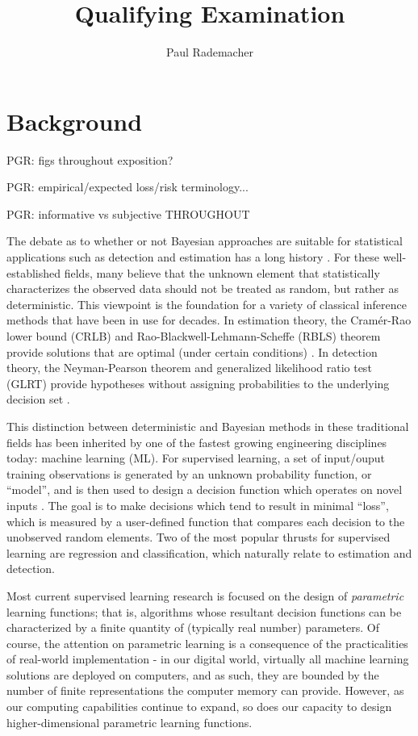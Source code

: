 \documentclass[12pt]{article}
\title{Qualifying Examination}
\author{Paul Rademacher}
\begin{document}
\maketitle

\newpage
\tableofcontents


\newpage
\section{Background} \label{sec:background}

PGR: figs throughout exposition?

PGR: empirical/expected loss/risk terminology...

PGR: informative vs subjective THROUGHOUT

The debate as to whether or not Bayesian approaches are suitable for statistical applications such as detection and estimation has a long history \cite{box}. For these well-established fields, many believe that the unknown element that statistically characterizes the observed data should not be treated as random, but rather as deterministic. This viewpoint is the foundation for a variety of classical inference methods that have been in use for decades. In estimation theory, the Cram\'er-Rao lower bound (CRLB) and Rao-Blackwell-Lehmann-Scheffe (RBLS) theorem provide solutions that are optimal (under certain conditions) \cite{kay-est}. In detection theory, the Neyman-Pearson theorem and generalized likelihood ratio test (GLRT) provide hypotheses without assigning probabilities to the underlying decision set \cite{kay-det}.

This distinction between deterministic and Bayesian methods in these traditional fields has been inherited by one of the fastest growing engineering disciplines today: machine learning (ML). For supervised learning, a set of input/ouput training observations is generated by an unknown probability function, or ``model'', and is then used to design a decision function which operates on novel inputs \cite{bishop}. The goal is to make decisions which tend to result in minimal ``loss'', which is measured by a user-defined function that compares each decision to the unobserved random elements. Two of the most popular thrusts for supervised learning are regression and classification, which naturally relate to estimation and detection. 

Most current supervised learning research is focused on the design of \emph{parametric} learning functions; that is, algorithms whose resultant decision functions can be characterized by a finite quantity of (typically real number) parameters. Of course, the attention on parametric learning is a consequence of the practicalities of real-world implementation - in our digital world, virtually all machine learning solutions are deployed on computers, and as such, they are bounded by the number of finite representations the computer memory can provide. However, as our computing capabilities continue to expand, so does our capacity to design higher-dimensional parametric learning functions.
\end{document}
